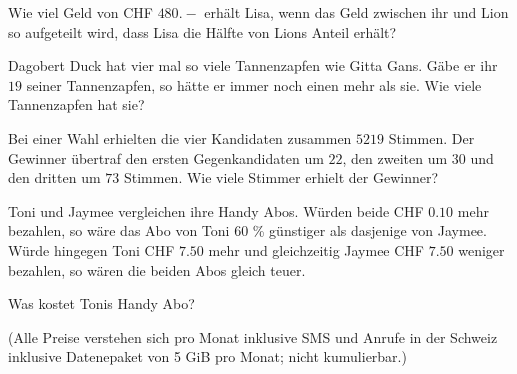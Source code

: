 \begin{bbwAufgabenBlock}


\item Wie viel Geld von CHF $480.-$ erhält Lisa, wenn das Geld
zwischen ihr und Lion so aufgeteilt wird, dass Lisa die Hälfte von
Lions Anteil erhält?


\item Dagobert Duck hat vier mal so viele Tannenzapfen wie Gitta
Gans. Gäbe er ihr $19$ seiner Tannenzapfen, so hätte er immer noch einen
mehr als sie. Wie viele Tannenzapfen hat sie?


\item Bei einer Wahl erhielten die vier Kandidaten zusammen $5219$
Stimmen. Der Gewinner übertraf den ersten Gegenkandidaten um $22$, den
zweiten um $30$ und den dritten um $73$ Stimmen. Wie viele Stimmer erhielt
der Gewinner?


\noTRAINER{\newpage}

\item Toni und Jaymee vergleichen ihre Handy Abos.
Würden beide CHF $0.10$ mehr bezahlen, so wäre das Abo von Toni 60 \% günstiger als dasjenige von Jaymee.
Würde hingegen Toni CHF $7.50$ mehr und gleichzeitig Jaymee CHF $7.50$ weniger bezahlen, so wären die beiden Abos gleich teuer.

Was kostet Tonis Handy Abo?


{\tiny{(Alle Preise verstehen sich pro Monat inklusive SMS und Anrufe in der Schweiz inklusive Datenepaket von 5 GiB pro Monat; nicht kumulierbar.)}}




\end{bbwAufgabenBlock}


\platzFuerBerechnungenBisEndeSeite{}%
%
